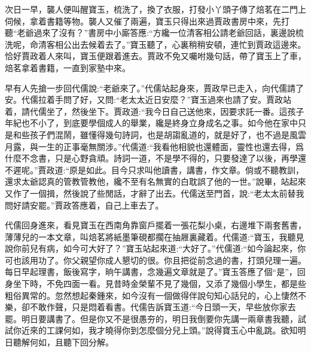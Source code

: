 \begin{parag}
    次日一早，襲人便叫醒寶玉，梳洗了，換了衣服，打發小丫頭子傳了焙茗在二門上伺候，拿着書籍等物。襲人又催了兩遍，寶玉只得出來過賈政書房中來，先打聽“老爺過來了沒有？”書房中小廝答應:“方纔一位清客相公請老爺回話，裏邊說梳洗呢，命清客相公出去候着去了。”寶玉聽了，心裏稍稍安頓，連忙到賈政這邊來。恰好賈政着人來叫，寶玉便跟着進去。賈政不免又囑咐幾句話，帶了寶玉上了車，焙茗拿着書籍，一直到家塾中來。
\end{parag}


\begin{parag}
    早有人先搶一步回代儒說:“老爺來了。”代儒站起身來，賈政早已走入，向代儒請了安。代儒拉着手問了好，又問:“老太太近日安麼？”寶玉過來也請了安。賈政站着，請代儒坐了，然後坐下。賈政道:“我今日自己送他來，因要求託一番。這孩子年紀也不小了，到底要學個成人的舉業，纔是終身立身成名之事。如今他在家中只是和些孩子們混鬧，雖懂得幾句詩詞，也是胡謅亂道的，就是好了，也不過是風雲月露，與一生的正事毫無關涉。”代儒道:“我看他相貌也還體面，靈性也還去得，爲什麼不念書，只是心野貪頑。詩詞一道，不是學不得的，只要發達了以後，再學還不遲呢。”賈政道:“原是如此。目今只求叫他讀書，講書，作文章。倘或不聽教訓，還求太爺認真的管教管教他，纔不至有名無實的白耽誤了他的一世。”說畢，站起來又作了一個揖，然後說了些閒話，才辭了出去。代儒送至門首，說:“老太太前替我問好請安罷。”賈政答應着，自己上車去了。
\end{parag}


\begin{parag}
    代儒回身進來，看見寶玉在西南角靠窗戶擺着一張花梨小桌，右邊堆下兩套舊書，薄薄兒的一本文章，叫焙茗將紙墨筆硯都擱在抽屜裏藏着。代儒道:“寶玉，我聽見說你前兒有病，如今可大好了？”寶玉站起來道:“大好了。”代儒道:“如今論起來，你可也該用功了。你父親望你成人懇切的很。你且把從前念過的書，打頭兒理一遍。每日早起理書，飯後寫字，晌午講書，念幾遍文章就是了。”寶玉答應了個“是”，回身坐下時，不免四面一看。見昔時金榮輩不見了幾個，又添了幾個小學生，都是些粗俗異常的。忽然想起秦鍾來，如今沒有一個做得伴說句知心話兒的，心上悽然不樂，卻不敢作聲，只是悶着看書。代儒告訴寶玉道:“今日頭一天，早些放你家去罷。明日要講書了。但是你又不是很愚夯的，明日我倒要你先講一兩章書我聽，試試你近來的工課何如，我才曉得你到怎麼個分兒上頭。”說得寶玉心中亂跳。欲知明日聽解何如，且聽下回分解。
\end{parag}
